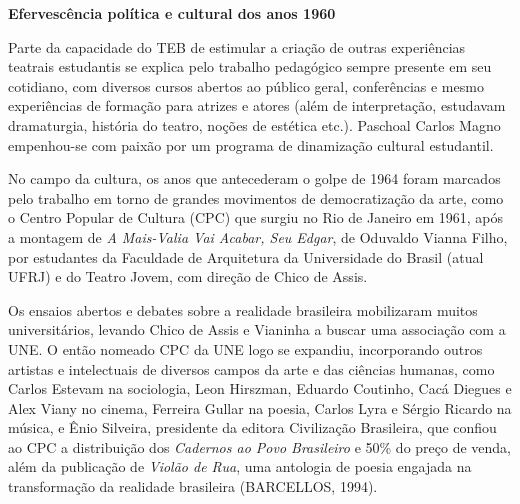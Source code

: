 \textbf{Efervescência política e cultural dos anos 1960}

Parte da capacidade do TEB de estimular a criação de outras experiências
teatrais estudantis se explica pelo trabalho pedagógico sempre presente
em seu cotidiano, com diversos cursos abertos ao público geral,
conferências e mesmo experiências de formação para atrizes e atores
(além de interpretação, estudavam dramaturgia, história do teatro,
noções de estética etc.). Paschoal Carlos Magno empenhou-se com paixão
por um programa de dinamização cultural estudantil.

No campo da cultura, os anos que antecederam o golpe de 1964 foram
marcados pelo trabalho em torno de grandes movimentos de democratização
da arte, como o Centro Popular de Cultura (CPC) que surgiu no Rio de
Janeiro em 1961, após a montagem de \textit{A Mais-Valia Vai Acabar, Seu
Edgar}, de Oduvaldo Vianna Filho, por estudantes da Faculdade de
Arquitetura da Universidade do Brasil (atual UFRJ) e do Teatro Jovem,
com direção de Chico de Assis.

Os ensaios abertos e debates sobre a realidade brasileira mobilizaram
muitos universitários, levando Chico de Assis e Vianinha a buscar uma
associação com a UNE. O então nomeado CPC da UNE logo se expandiu,
incorporando outros artistas e intelectuais de diversos campos da arte e
das ciências humanas, como Carlos Estevam na sociologia, Leon Hirszman,
Eduardo Coutinho, Cacá Diegues e Alex Viany no cinema, Ferreira Gullar
na poesia, Carlos Lyra e Sérgio Ricardo na música, e Ênio Silveira,
presidente da editora Civilização Brasileira, que confiou ao CPC a
distribuição dos \textit{Cadernos ao Povo Brasileiro} e 50\%
do preço de venda, além da publicação de \textit{Violão de Rua}, uma
antologia de poesia engajada na transformação da realidade brasileira
(BARCELLOS, 1994).

